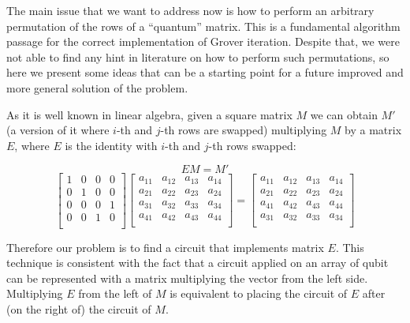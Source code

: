 The main issue that we want to address now is how to perform an arbitrary permutation of the rows of a ``quantum'' matrix. This is a fundamental algorithm passage for the correct implementation of Grover iteration. Despite that, we were not able to find any hint in literature on how to perform such permutations, so here we present some ideas that can be a starting point for a future improved and more general solution of the problem.

\bigskip

As it is well known in linear algebra, given a square matrix $M$ we can obtain $M'$ (a version of it where $i$-th and $j$-th rows are swapped) multiplying $M$ by a matrix $E$, where $E$ is the identity with $i$-th and $j$-th rows swapped:

\begin{equation*}
E M = M'
\end{equation*}
\begin{equation*}
	\begin{bmatrix}
	1 & 0 & 0 & 0\\
	0 & 1 & 0 & 0\\
	0 & 0 & 0 & 1\\
	0 & 0 & 1 & 0\\
	\end{bmatrix}
	\begin{bmatrix}
	a_{11} & a_{12} & a_{13} & a_{14}\\
	a_{21} & a_{22} & a_{23} & a_{24}\\
	a_{31} & a_{32} & a_{33} & a_{34}\\
	a_{41} & a_{42} & a_{43} & a_{44}\\
	\end{bmatrix}
	=
	\begin{bmatrix}
	a_{11} & a_{12} & a_{13} & a_{14}\\
	a_{21} & a_{22} & a_{23} & a_{24}\\
	a_{41} & a_{42} & a_{43} & a_{44}\\
	a_{31} & a_{32} & a_{33} & a_{34}\\
	\end{bmatrix}
\end{equation*}

\bigskip

Therefore our problem is to find a circuit that implements matrix $E$. This technique is consistent with the fact that a circuit applied on an array of qubit can be represented with a matrix multiplying the vector from the left side. Multiplying $E$ from the left of $M$ is equivalent to placing the circuit of $E$ after (on the right of) the circuit of $M$.


